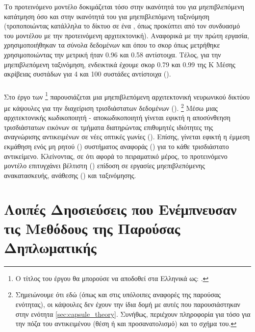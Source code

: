 Το προτεινόμενο μοντέλο δοκιμάζεται τόσο στην ικανότητά του για μη\textendash επιβλεπόμενη κατάτμηση όσο και στην ικανότητά του για μη\textendash επιβλεπόμενη ταξινόμηση (τροποποιώντας κατάλληλα το δίκτυο σε ένα , όπως προκύπτει από τον συνδυασμό του μοντέλου  με την προτεινόμενη αρχιτεκτονική). Αναφορικά με την πρώτη εργασία, χρησιμοποιήθηκαν τα σύνολα δεδομένων  και  όπου το σκορ όπως μετρήθηκε χρησιμοποιώντας την μετρική  ήταν 0.96 και 0.58 αντίστοιχα. Τέλος, για την μη\textendash επιβλεπόμενη ταξινόμηση, ενδεικτικά έχουμε σκορ 0.79 και 0.99 της Κ \textendash Μέσης ακρίβειας συστάδων για 4 και 100 συστάδες αντίστοιχα ().

\subsubsection{}

Στο έργο των  \footnote{Ο τίτλος του έργου θα μπορούσε να αποδοθεί στα Ελληνικά ως: .} \cite{sun2021canonical} παρουσιάζεται μια μη\textendash επιβλεπόμενη αρχιτεκτονική νευρωνικού δικτύου με κάψουλες για την διαχείριση τρισδιάστατων δεδομένων (). \footnote{Σημειώνουμε ότι εδώ (όπως και στις υπόλοιπες αναφορές της παρούσας ενότητας), οι κάψουλες δεν έχουν την ίδια δομή με αυτές που παρουσιάστηκαν στην ενότητα \ref{sec:capsule_theory}. Συνήθως, περιέχουν πληροφορία για τόσο για την πόζα του αντικειμένου (θέση ή και προσανατολισμό) και το σχήμα του.} Μέσω μιας αρχιτεκτονικής κωδικοποιητή - αποκωδικοποιητή γίνεται εφικτή η αποσύνθεηση τρισδιάστατων εικόνων σε τμήματα διατηρώντας επιθυμητές ιδιότητες της αναγνώρισης αντικειμένων σε νέες οπτικές γωνίες (). Επίσης, γίνεται εφικτή η έμμεση εκμάθηση ενός μη ρητού () συστήματος αναφοράς () για το κάθε τρισδιάστατο αντικείμενο. Κλείνοντας, σε ότι αφορά το πειραματικό μέρος, το προτεινόμενο μοντέλο επιτυγχάνει βέλτιστη () επίδοση σε εργασίες μη\textendash επιβλεπόμενης ανακατασκευής, ανάθεσης () και ταξινόμησης. 

\section{Λοιπές Δηοσιεύσεις που Ενέμπνευσαν τις Μεθόδους της Παρούσας Δηπλωματικής}

